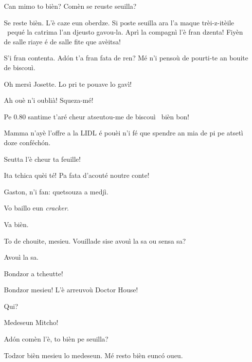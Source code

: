 \begin{drama}
\Feliespeaks Can mimo to bièn? Comèn se reuste seuilla?

\Gerominespeaks {} Se reste bièn. L’è caze eun oberdze. Si poste seuilla ara l’a maque trèi-z-itèile \stella\ pequé la catrima l’an djeusto gavou-la.  Aprì la compagnì l’è fran dzenta! Fiyèn de salle riaye é de salle fite que avèitsa!

\Feliespeaks S’i fran contenta. Ad\'on t’a fran fata de ren? Mé n'i pensoù de pourti-te an bouite de biscouì.

\Gerominespeaks Oh mersì Josette.  Lo pri te pouave lo gavì!

\Feliespeaks Ah ouè n’i oublià! Squeza-mé!

\Gerominespeaks Pe $0.80$ santime t’aré cheur atseutou-me de biscouì \biscotto\ bièn bon!

\Feliespeaks Mamma n’ayè l’offre a la LIDL é pouèi n’i fé que spendre an mia de pi pe atsetì doze conféch\'on.

\Casimirspeaks Seutta l’è cheur ta feuille!

\Gerominespeaks Ita tchica quèi té! Pa fata d'acouté noutre conte!

\PersEmpourtantaspeaks {} Gaston, n’i fan: quetsouza a medjì.

\Eunfeurmispeaks Vo baillo eun \textit{cracker}. 

\PersEmpourtantaspeaks Va bièn.

\Eunfeurmispeaks To de chouite, mesieu. Vouillade sise avouì la sa ou sensa sa?

\PersEmpourtantaspeaks Avouì la sa. 



\MedMitchospeaks Bondzor a tcheutte!

\Eunfeurmispeaks  Bondzor mesieu! L'è arreuvoù Doctor House!

\Casimirspeaks Qui?

\Eunfeurmispeaks Medeseun Mitcho!

\MedMitchospeaks Ad\'on comèn l'è, to bièn pe seuilla?

\Gerominespeaks Todzor bièn mesieu lo medeseun. Mé resto bièn eunc\'o oueu.


\end{drama}
